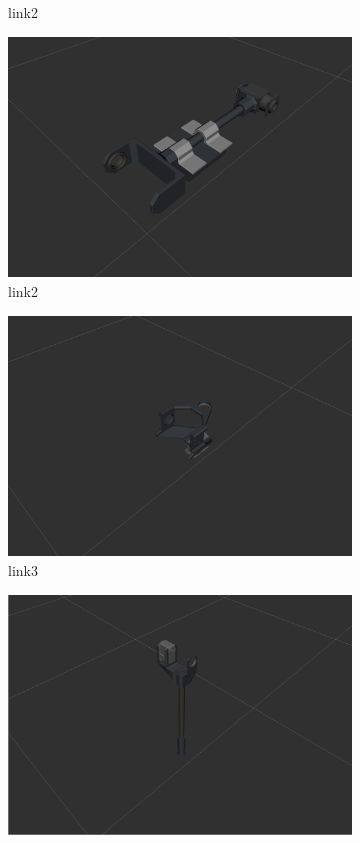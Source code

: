 \begin{figure}[h!]
\begin{subfigure}[b]{0.2\linewidth}
    \caption{link2}
  \end{subfigure}
  \begin{subfigure}[b]{0.2\linewidth}
    \includegraphics[width=\linewidth]{link2.png}
    \caption{link2}
  \end{subfigure}
  \begin{subfigure}[b]{0.2\linewidth}
    \includegraphics[width=\linewidth]{link3.png}
    \caption{link3}
  \end{subfigure}
  \begin{subfigure}[b]{0.2\linewidth}
    \includegraphics[width=\linewidth]{link4.png}

\end{subfigure}
\end{figure}
